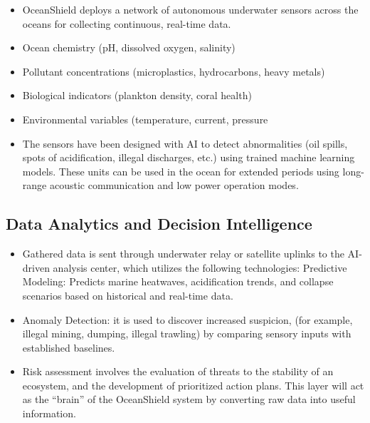 \documentclass[a4paper]{article}
\begin{document}
\begin{itemize}
    \item OceanShield deploys a network of autonomous underwater sensors across the oceans for collecting continuous, real-time data.

    \item Ocean chemistry (pH, dissolved oxygen, salinity)

    \item Pollutant concentrations (microplastics, hydrocarbons, heavy metals)

    \item Biological indicators (plankton density, coral health)

    \item Environmental variables (temperature, current, pressure

    \item The sensors have been designed with AI to detect abnormalities (oil spills, spots of acidification, illegal discharges, etc.) using trained machine learning models. These units can be used in the ocean for extended periods using long-range acoustic communication and low power operation modes.


\end{itemize}

\subsection{Data Analytics and Decision Intelligence}

\begin{itemize}
    \item Gathered data is sent through underwater relay or satellite uplinks to the AI-driven analysis center, which utilizes the following technologies: Predictive Modeling: Predicts marine heatwaves, acidification trends, and collapse scenarios based on historical and real-time data.

    \item Anomaly Detection: it is used to discover increased suspicion, (for example, illegal mining, dumping, illegal trawling) by comparing sensory inputs with established baselines.

    \item Risk assessment involves the evaluation of threats to the stability of an ecosystem, and the development of prioritized action plans. This layer will act as the “brain” of the OceanShield system by converting raw data into useful information.

\end{itemize}
\end{document}
